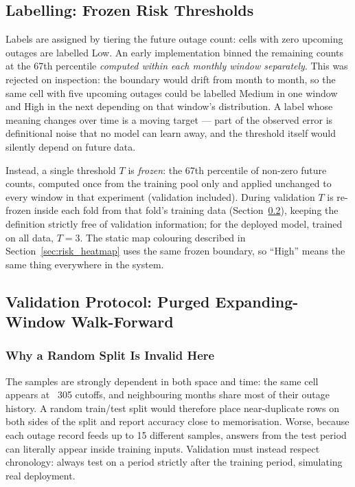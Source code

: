 \subsection{Labelling: Frozen Risk Thresholds}
\label{sec:frozen_labels}

Labels are assigned by tiering the future outage count: cells with zero upcoming outages are labelled Low. An early implementation binned the remaining counts at the 67th percentile \emph{computed within each monthly window separately}. This was rejected on inspection: the boundary would drift from month to month, so the same cell with five upcoming outages could be labelled Medium in one window and High in the next depending on that window's distribution. A label whose meaning changes over time is a moving target --- part of the observed error is definitional noise that no model can learn away, and the threshold itself would silently depend on future data.

Instead, a single threshold $T$ is \emph{frozen}: the 67th percentile of non-zero future counts, computed once from the training pool only and applied unchanged to every window in that experiment (validation included). During validation $T$ is re-frozen inside each fold from that fold's training data (Section~\ref{sec:walkforward}), keeping the definition strictly free of validation information; for the deployed model, trained on all data, $T = 3$. The static map colouring described in Section~\ref{sec:risk_heatmap} uses the same frozen boundary, so ``High'' means the same thing everywhere in the system.

\subsection{Validation Protocol: Purged Expanding-Window Walk-Forward}
\label{sec:walkforward}

\subsubsection{Why a Random Split Is Invalid Here}

The samples are strongly dependent in both space and time: the same cell appears at ~305 cutoffs, and neighbouring months share most of their outage history. A random train/test split would therefore place near-duplicate rows on both sides of the split and report accuracy close to memorisation. Worse, because each outage record feeds up to 15 different samples, answers from the test period can literally appear inside training inputs. Validation must instead respect chronology: always test on a period strictly after the training period, simulating real deployment.

